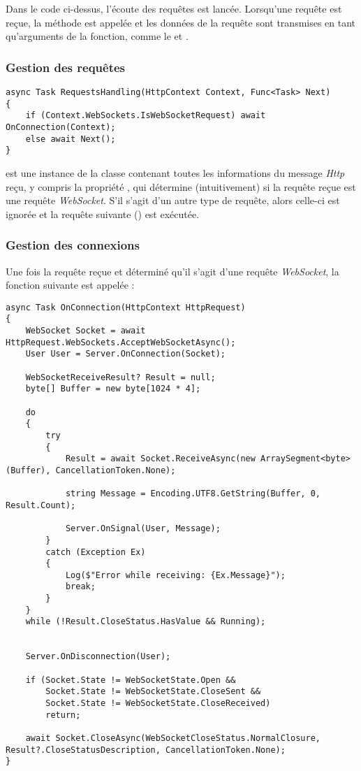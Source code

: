 \documentclass{article}
\begin{document}
Dans le code ci-dessus, l'écoute des requêtes est lancée. Lorsqu'une requête est reçue, la méthode  est appelée et les données de la requête sont transmises en tant qu'arguments de la fonction, comme le  et .

\subsubsection{Gestion des requêtes}
\begin{verbatim}
async Task RequestsHandling(HttpContext Context, Func<Task> Next)
{
    if (Context.WebSockets.IsWebSocketRequest) await OnConnection(Context);
    else await Next();
}
\end{verbatim}

 est une instance de la classe  contenant toutes les informations du message \textit{Http} reçu, y compris la propriété , qui détermine (intuitivement) si la requête reçue est une requête \textit{WebSocket}. S'il s'agit d'un autre type de requête, alors celle-ci est ignorée et la requête suivante () est exécutée.

\subsubsection{Gestion des connexions}

Une fois la requête reçue et déterminé qu’il s’agit d’une requête \textit{WebSocket}, la fonction  suivante est appelée :

\begin{verbatim}
async Task OnConnection(HttpContext HttpRequest)
{
    WebSocket Socket = await HttpRequest.WebSockets.AcceptWebSocketAsync();
    User User = Server.OnConnection(Socket);

    WebSocketReceiveResult? Result = null;
    byte[] Buffer = new byte[1024 * 4];

    do
    {
        try
        {
            Result = await Socket.ReceiveAsync(new ArraySegment<byte>(Buffer), CancellationToken.None);

            string Message = Encoding.UTF8.GetString(Buffer, 0, Result.Count);

            Server.OnSignal(User, Message);
        }
        catch (Exception Ex)
        {
            Log($"Error while receiving: {Ex.Message}");
            break;
        }
    }
    while (!Result.CloseStatus.HasValue && Running);


    Server.OnDisconnection(User);

    if (Socket.State != WebSocketState.Open &&
        Socket.State != WebSocketState.CloseSent &&
        Socket.State != WebSocketState.CloseReceived)
        return;

    await Socket.CloseAsync(WebSocketCloseStatus.NormalClosure, Result?.CloseStatusDescription, CancellationToken.None);
}
\end{verbatim}
\end{document}

